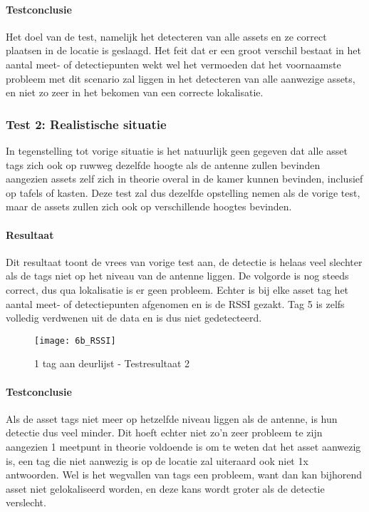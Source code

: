 \paragraph{Testconclusie}
Het doel van de test, namelijk het detecteren van alle assets en ze correct plaatsen in de locatie is geslaagd. Het feit dat er een groot verschil bestaat in het aantal meet- of detectiepunten wekt wel het vermoeden dat het voornaamste probleem met dit scenario zal liggen in het detecteren van alle aanwezige assets, en niet zo zeer in het bekomen van een correcte lokalisatie.

\subsubsection{Test 2: Realistische situatie}
In tegenstelling tot vorige situatie is het natuurlijk geen gegeven dat alle asset tags zich ook op ruwweg dezelfde hoogte als de antenne zullen bevinden aangezien assets zelf zich in theorie overal in de kamer kunnen bevinden, inclusief op tafels of kasten. Deze test zal dus dezelfde opstelling nemen als de vorige test, maar de assets zullen zich ook op verschillende hoogtes bevinden.

\paragraph{Resultaat}
Dit resultaat toont de vrees van vorige test aan, de detectie is helaas veel slechter als de tags niet op het niveau van de antenne liggen. De volgorde is nog steeds correct, dus qua lokalisatie is er geen probleem. Echter is bij elke asset tag het aantal meet- of detectiepunten afgenomen en is de RSSI gezakt. Tag 5 is zelfs volledig verdwenen uit de data en is dus niet gedetecteerd.
\begin{figure}[h]
	\texttt{[image: 6b\_RSSI]}
	\caption{1 tag aan deurlijst - Testresultaat 2}
	\label{fig:ond-rfid-dynamic-6b-res}
\end{figure}

\paragraph{Testconclusie}
Als de asset tags niet meer op hetzelfde niveau liggen als de antenne, is hun detectie dus veel minder. Dit hoeft echter niet zo'n zeer probleem te zijn aangezien 1 meetpunt in theorie voldoende is om te weten dat het asset aanwezig is, een tag die niet aanwezig is op de locatie zal uiteraard ook niet 1x antwoorden. Wel is het wegvallen van tags een probleem, want dan kan bijhorend asset niet gelokaliseerd worden, en deze kans wordt groter als de detectie verslecht.

